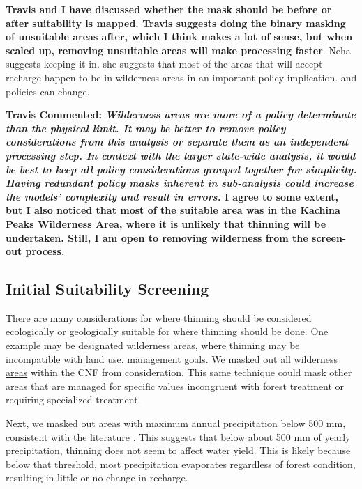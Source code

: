 \documentclass[
  number,
  preprint,
  3p,
  onecolumn]{elsarticle}
\begin{document}
\textbf{Travis and I have discussed whether the mask should be before or
after suitability is mapped. Travis suggests doing the binary masking of
unsuitable areas after, which I think makes a lot of sense, but when
scaled up, removing unsuitable areas will make processing faster}. Neha
suggests keeping it in. she suggests that most of the areas that will
accept recharge happen to be in wilderness areas in an important policy
implication. and policies can change.

\textbf{Travis Commented: \emph{Wilderness areas are more of a policy
determinate than the physical limit. It may be better to remove policy
considerations from this analysis or separate them as an independent
processing step. In context with the larger state-wide analysis, it
would be best to keep all policy considerations grouped together for
simplicity. Having redundant policy masks inherent in sub-analysis could
increase the models' complexity and result in errors.} I agree to some
extent, but I also noticed that most of the suitable area was in the
Kachina Peaks Wilderness Area, where it is unlikely that thinning will
be undertaken. Still, I am open to removing wilderness from the
screen-out process.}

\subsection{Initial Suitability
Screening}\label{initial-suitability-screening}

There are many considerations for where thinning should be considered
ecologically or geologically suitable for where thinning should be done.
One example may be designated wilderness areas, where thinning may be
incompatible with land use. management goals. We masked out all
\href{https://gis1.usgs.gov/arcgis/rest/services/padus3/Fee_Managers/MapServer}{wilderness
areas} within the CNF from consideration. This same technique could mask
other areas that are managed for specific values incongruent with forest
treatment or requiring specialized treatment.

Next, we masked out areas with maximum annual precipitation below 500
mm, consistent with the literature
\citep{bosch1982, hibbert1979b, adams2012a, biederman2022a}. This
suggests that below about 500 mm of yearly precipitation, thinning does
not seem to affect water yield. This is likely because below that
threshold, most precipitation evaporates regardless of forest condition,
resulting in little or no change in recharge.
\end{document}

